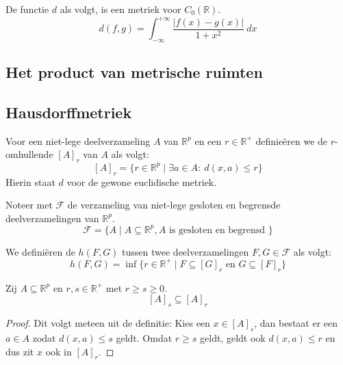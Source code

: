 \documentclass[main.tex]{subfiles}
\begin{document}
\begin{vb}
  De functie $d$ als volgt, is een metriek voor $C_{0}(\mathbb{R})$.
  \[ d(f,g) = \int_{-\infty}^{+\infty}\frac{|f(x)-g(x)|}{1+x^{2}}\ dx \]
\end{vb}


\subsection{Het product van metrische ruimten}
\label{sec:het-product-van}


\subsection{Hausdorffmetriek}
\label{sec:hausdorffmetriek}

\begin{de}
  Voor een niet-lege deelverzameling $A$ van $\mathbb{R}^{p}$ en een $r\in \mathbb{R}^{+}$ definie\"eren we de $r$-omhullende $[A]_{r}$ van $A$ als volgt:
  \[ [A]_{r} = \{r \in \mathbb{R}^{p} \mid \exists a \in A:\ d(x,a) \le r \} \]
  Hierin staat $d$ voor de gewone euclidische metriek.
\end{de}

\begin{de}
  Noteer met $\mathcal{F}$ de verzameling van niet-lege gesloten en begrensde deelverzamelingen van $\mathbb{R}^{p}$.
  \[ \mathcal{F} = \{ A \mid A \subseteq \mathbb{R}^{p}, A \text{ is gesloten en begrensd } \} \]
\end{de}

\begin{de}
  We defini\"eren de  $h(F,G)$ tussen twee deelverzamelingen $F,G \in \mathcal{F}$ als volgt:
  \[ h(F,G) = \inf\{ r\in \mathbb{R}^{+} \mid F \subseteq [G]_{r} \text{ en } G \subseteq [F]_{r} \} \]
\end{de}

\begin{blem}
  \label{lem:omhullenden-in-elkaar}
  Zij $A \subseteq \mathbb{R}^{p}$ en $r,s\in\mathbb{R}^{+}$ met $r\ge s \ge 0$.
  \[ [A]_{s} \subseteq [A]_{r} \]

  \begin{proof}
    Dit volgt meteen uit de definitie:
    Kies een $x\in [A]_{s}$, dan bestaat er een $a\in A$ zodat $d(x,a) \le s$ geldt.
    Omdat $r \ge s$ geldt, geldt ook $d(x,a) \le r$ en dus zit $x$ ook in $[A]_{r}$.
  \end{proof}
\end{blem}
\end{document}
